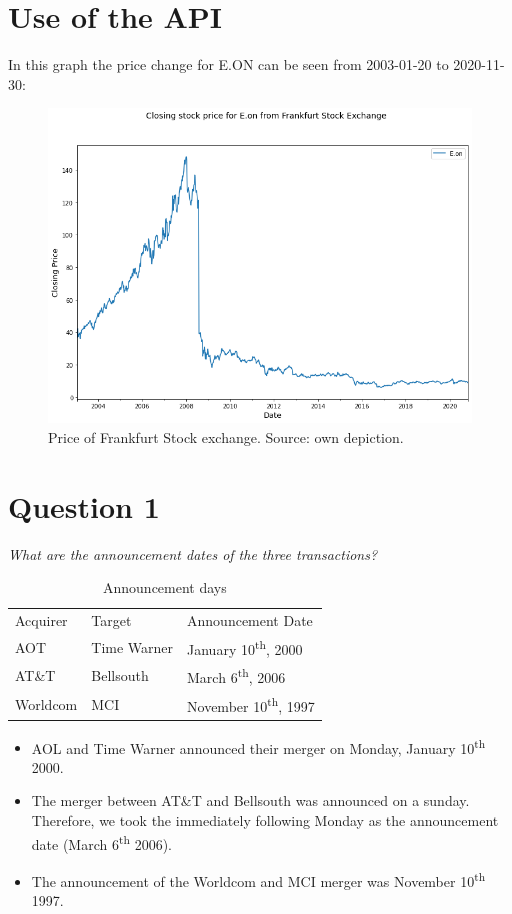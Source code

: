 
\section{Use of the API}
\label{key}
In this graph the price change for E.ON can be seen from 2003-01-20 to 2020-11-30:\newline

\begin{figure}[H]
	\centering
	\includegraphics[scale=0.5]{images/Stock_Eon.png}
	\caption{Price of Frankfurt Stock exchange. Source: own depiction.}
	\label{stock}
\end{figure}


\newpage

\section{Question 1}
\textit{What are the announcement dates of the three transactions?}
\begin{table}[H]
    \centering
    \begin{tabular}{|l|l|l|}
    \thickhline
         Acquirer & Target & Announcement Date \\\thickhline
         AOT& Time Warner & January 10\textsuperscript{th}, 2000 \\
         AT\&T& Bellsouth& March 6\textsuperscript{th}, 2006\\
        Worldcom& MCI& November 10\textsuperscript{th}, 1997\\ \hline
    \end{tabular}
    \caption{Announcement days}
    \label{aanounce}
\end{table}
\begin{itemize}
    \item AOL and Time Warner announced their merger on Monday, January 10\textsuperscript{th} 2000.
    \item The merger between AT\&T and Bellsouth was announced on a sunday. Therefore, we took the immediately following Monday as the announcement date (March 6\textsuperscript{th} 2006).
    \item The announcement of the Worldcom and MCI merger was November 10\textsuperscript{th} 1997.
\end{itemize}

